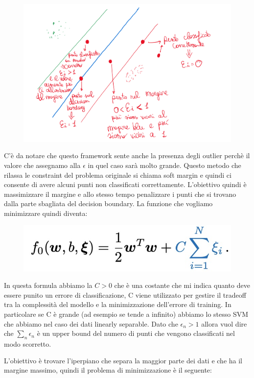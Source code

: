 \documentclass[14pt]{extreport}
\begin{document}
\begin{figure}[H]
\centering
  \includegraphics[width=0.7\linewidth]{567.jpeg}
\end{figure}

C'è da notare che questo framework sente anche la presenza degli outlier perchè il valore che assegnamo alla $\epsilon$ in quel caso sarà molto
grande. Questo metodo che rilassa le constraint del problema originale si chiama soft margin e quindi ci consente di avere alcuni punti non
classificati correttamente. L'obiettivo quindi è massimizzare il margine e allo stesso tempo penalizzare i punti che si trovano dalla parte sbagliata
del decision boundary. La funzione che vogliamo minimizzare quindi diventa:

\begin{figure}[H]
\centering
\includegraphics[width=0.7\linewidth]{323.jpeg}
\end{figure}

In questa formula abbiamo la $C>0$ che è una costante che mi indica quanto deve essere punito un errore di classificazione, C viene utilizzato per
gestire il tradeoff tra la complessità del modello e la minimizzazione dell'errore di training. In particolare se C è grande (ad esempio se tende a
infinito) abbiamo lo stesso SVM che abbiamo nel caso dei dati linearly separable. Dato che $\epsilon_n > 1$ allora vuol dire che $\sum_n\epsilon_n$ è
un upper bound del numero di punti che vengono classificati nel modo scorretto.
 
 L'obiettivo è trovare l'iperpiano che separa la maggior parte dei dati e che ha il margine massimo, quindi il problema di minimizzazione è il
 seguente:
 
\end{document}
